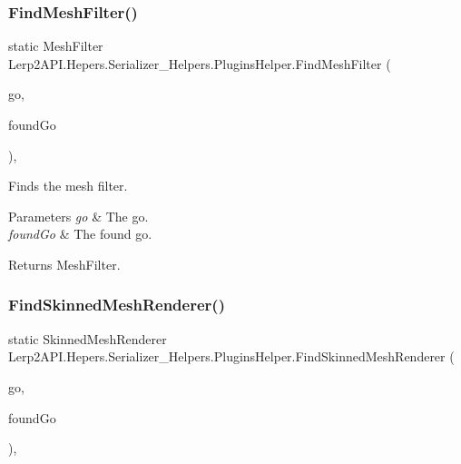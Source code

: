 \subsubsection{\texorpdfstring{Find\+Mesh\+Filter()}{FindMeshFilter()}}
{\footnotesize\ttfamily static Mesh\+Filter Lerp2\+A\+P\+I.\+Hepers.\+Serializer\+\_\+\+Helpers.\+Plugins\+Helper.\+Find\+Mesh\+Filter (\begin{DoxyParamCaption}\item[{Game\+Object}]{go,  }\item[{ref Game\+Object}]{found\+Go }\end{DoxyParamCaption})\hspace{0.3cm}{\ttfamily [inline]}, {\ttfamily [static]}}



Finds the mesh filter. 


\begin{DoxyParams}{Parameters}
{\em go} & The go.\\
\hline
{\em found\+Go} & The found go.\\
\hline
\end{DoxyParams}
\begin{DoxyReturn}{Returns}
Mesh\+Filter.
\end{DoxyReturn}
\mbox{\label{class_lerp2_a_p_i_1_1_hepers_1_1_serializer___helpers_1_1_plugins_helper_a1493c1b7f3150288cecb794c46f63e0a}} 
\subsubsection{\texorpdfstring{Find\+Skinned\+Mesh\+Renderer()}{FindSkinnedMeshRenderer()}}
{\footnotesize\ttfamily static Skinned\+Mesh\+Renderer Lerp2\+A\+P\+I.\+Hepers.\+Serializer\+\_\+\+Helpers.\+Plugins\+Helper.\+Find\+Skinned\+Mesh\+Renderer (\begin{DoxyParamCaption}\item[{Game\+Object}]{go,  }\item[{ref Game\+Object}]{found\+Go }\end{DoxyParamCaption})\hspace{0.3cm}{\ttfamily [inline]}, {\ttfamily [static]}}



